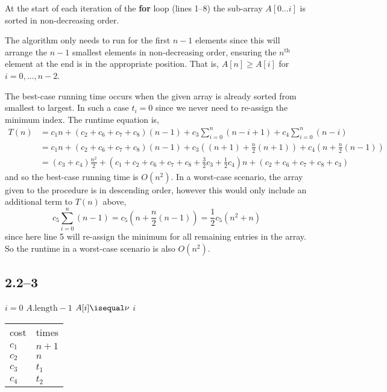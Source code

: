 \begin{invariant}
	At the start of each iteration of the \textbf{for} loop (lines 1--8) the sub-array $A[0\ldots i]$ is sorted in non-decreasing order.
\end{invariant}

The algorithm only needs to run for the first $n-1$ elements since this will arrange the $n-1$ smallest elements in non-decreasing order, ensuring the $n^{\text{th}}$ element at the end is in the appropriate position. That is, $A[n]\geq A[i]$ for $i=0,\ldots,n-2$.

The best-case running time occurs when the given array is already sorted from smallest to largest. In such a case $t_{i}=0$ since we never need to re-assign the minimum index. The runtime equation is, 
\begin{equation*}
	\begin{aligned}
		T(n) &= c_{1}n + (c_{2}+c_{6}+c_{7}+c_{8})(n-1) + c_{3}\sum_{i=0}^{n}(n-i+1) + c_{4}\sum_{i=0}^{n}(n-i)\\
		&= c_{1}n + (c_{2}+c_{6}+c_{7}+c_{8})(n-1) + c_{3}\left((n+1) + \frac{n}{2}(n+1)\right) + c_{4}\left(n + \frac{n}{2}(n-1)\right)\\
		&= (c_{3}+c_{4})\frac{n^{2}}{2} + (c_{1} + c_{2} + c_{6} + c_{7} + c_{8} + \frac{3}{2}c_{3} + \frac{1}{2}c_{4})n + (c_{2}+c_{6}+c_{7}+c_{8} + c_{3})
	\end{aligned}
\end{equation*}
and so the best-case running time is $O(n^{2})$. In a worst-case scenario, the array given to the procedure is in descending order, however this would only include an additional term to $T(n)$ above,
\begin{equation*}
	c_{5}\sum_{i=0}^{n}(n-1) = c_{5}\left(n + \frac{n}{2}(n-1)\right) = \frac{1}{2}c_{5}(n^{2}+n)
\end{equation*}
since here line 5 will re-assign the minimum for all remaining entries in the array. So the runtime in a worst-case scenario is also $O(n^{2})$.

\subsection*{2.2--3}

\begin{multicols}{2}
	\begin{codebox}
		\li \For $i = 0$ \To $A.\text{length}-1$
		\li	\Do
					\If $A[i] \isequal \nu$
		\li		\Then
						\Return $i$
					\End
				\End
		\li \Return {}
	\end{codebox}
	\columnbreak
	\begin{tabular}{ l l }
		cost & times\\
		$c_{1}$ & $n+1$\\
		$c_{2}$ & $n$\\
		$c_{3}$ & $t_{1}$\\
		$c_{4}$ & $t_{2}$
	\end{tabular}
\end{multicols}


